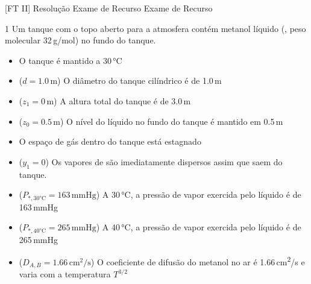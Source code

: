 \documentclass[\mainfilename]{subfiles}
\begin{document}

[FT II]
{Resolução Exame de Recurso} %
{Exame de Recurso} %


\begin{questionBox}1{ %
    Um tanque com o topo aberto para a atmosfera contém metanol líquido (, peso molecular 32\,\unit{\gram/\mole}) no fundo do tanque.
} %
    \begin{itemize}
        \item O tanque é mantido a 30\,\unit{\celsius}
        \item (\(d=1.0\,\unit{\metre}\)) O diâmetro do tanque cilíndrico é de 1.0\,\unit{\metre}
        \item (\(z_1=0\,\unit{\metre}\)) A altura total do tanque é de 3.0\,\unit{\metre}
        \item (\(z_0=0.5\,\unit{\metre}\)) O nível do líquido no fundo do tanque é mantido em 0.5\,\unit{\metre}
        \item O espaço de gás dentro do tanque está estagnado
        \item (\(y_1=0\)) Os vapores de  são imediatamente dispersos assim que saem do tanque.
        \item (\(P_{*,30\unit{\celsius}}=163\,\unit{\mmHg}\)) A 30\,\unit{\celsius}, a pressão de vapor exercida pelo  líquido é de 163\,\unit{\mmHg}
        \item (\(P_{*,40\unit{\celsius}}=265\,\unit{\mmHg}\)) A 40\,\unit{\celsius}, a pressão de vapor exercida pelo  líquido é de 265\,\unit{\mmHg}
        \item (\(D_{A,B}=1.66\,\unit{\centi\metre^2/\second}\)) O coeficiente de difusão do metanol no ar é 1.66\,\unit{\centi\metre^2/\second} e varia com a temperatura \(T^{3/2}\)
    \end{itemize}


\end{questionBox}
\end{document}
